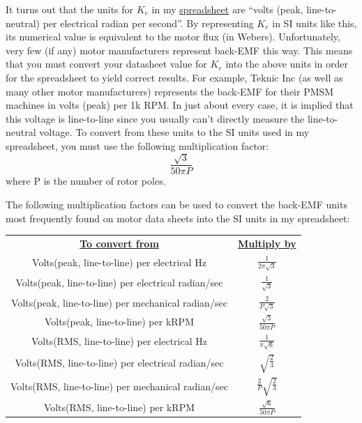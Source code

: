 It turns out that the units for $K_e$ in my \href{https://web.archive.org/web/20180101224106/http://e2e.ti.com/cfs-file/__key/telligent-evolution-components-attachments/13-852-00-00-00-66-49-89/PI-Calculator.xlsx?forcedownload=true}{spreadsheet} are “volts (peak, line-to-neutral) per electrical radian per second”.  By representing $K_e$ in SI units like this, its numerical value is equivalent to the motor flux (in Webers).  Unfortunately, very few (if any) motor manufacturers represent back-EMF this way.  This means that you must convert your datasheet value for $K_e$ into the above units in order for the spreadsheet to yield correct results.  For example, Teknic Inc (as well as many other motor manufacturers) represents the back-EMF for their PMSM machines in volts (peak) per 1k RPM.  In just about every case, it is implied that this voltage is line-to-line since you usually can’t directly measure the line-to-neutral voltage.  To convert from these units to the SI units used in my spreadsheet, you must use the following multiplication factor:
\begin{equation*}
    \frac{\sqrt 3}{50 \pi P}
\end{equation*}
where P is the number of rotor poles.

The following multiplication factors can be used to convert the back-EMF units most frequently found on motor data sheets into the SI units in my spreadsheet:

\begin{tabular}{cc}
    \textbf{\underline{To convert from}} & \textbf{\underline{Multiply by}}\\
    Volts(peak, line-to-line) per electrical Hz  & $\frac{1}{2\pi\sqrt3}$ \\
    Volts(peak, line-to-line) per electrical radian/sec &  $\frac1{\sqrt 3}$\\
    Volts(peak, line-to-line) per mechanical radian/sec  & $\frac2{P\sqrt 3}$ \\
    Volts(peak, line-to-line) per kRPM & $\frac{\sqrt 3}{50\pi P}$ \\
    Volts(RMS, line-to-line) per electrical Hz & $\frac{1}{\pi \sqrt 6}$ \\
    Volts(RMS, line-to-line) per electrical radian/sec & $\sqrt{\frac{2}{3}}$ \\
    Volts(RMS, line-to-line) per mechanical radian/sec & $\frac{2}{P}\sqrt{\frac{2}{3}}$ \\
    Volts(RMS, line-to-line) per kRPM & $\frac{\sqrt 6}{50 \pi P}$ \\
\end{tabular}
